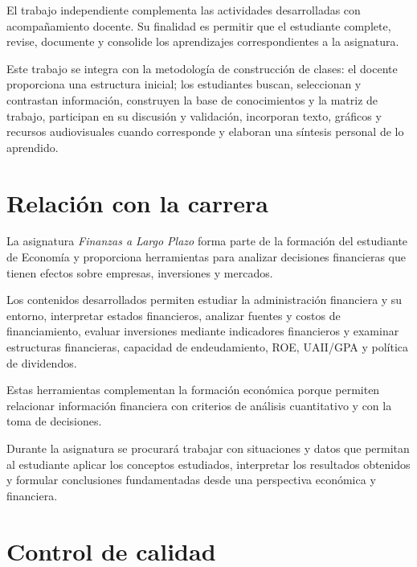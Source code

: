 \documentclass[10pt]{article}
\begin{document}
\begin{tcolorbox}[
    colback=blue!5,
    colframe=blue!55!black,
    title=\textbf{Una idea importante},
    fonttitle=\bfseries,
    boxrule=1pt,
    arc=2mm
]
El trabajo independiente complementa las actividades desarrolladas con
acompañamiento docente. Su finalidad es permitir que el estudiante
complete, revise, documente y consolide los aprendizajes correspondientes
a la asignatura.

Este trabajo se integra con la metodología de construcción de clases:
el docente proporciona una estructura inicial; los estudiantes buscan,
seleccionan y contrastan información, construyen la base de conocimientos
y la matriz de trabajo, participan en su discusión y validación, incorporan
texto, gráficos y recursos audiovisuales cuando corresponde y elaboran
una síntesis personal de lo aprendido.
\end{tcolorbox}

\section{Relación con la carrera}

La asignatura \textit{Finanzas a Largo Plazo} forma parte de la formación
del estudiante de Economía y proporciona herramientas para analizar
decisiones financieras que tienen efectos sobre empresas, inversiones y
mercados.\parencite{uaProgramaFinanzasLargoPlazo}

Los contenidos desarrollados permiten estudiar la administración financiera
y su entorno, interpretar estados financieros, analizar fuentes y costos de
financiamiento, evaluar inversiones mediante indicadores financieros y
examinar estructuras financieras, capacidad de endeudamiento, ROE, UAII/GPA
y política de dividendos.\parencite{uaProgramaFinanzasLargoPlazo}

Estas herramientas complementan la formación económica porque permiten
relacionar información financiera con criterios de análisis cuantitativo y
con la toma de decisiones.

Durante la asignatura se procurará trabajar con situaciones y datos que
permitan al estudiante aplicar los conceptos estudiados, interpretar los
resultados obtenidos y formular conclusiones fundamentadas desde una
perspectiva económica y financiera.



\section{Control de calidad}
\end{document}
